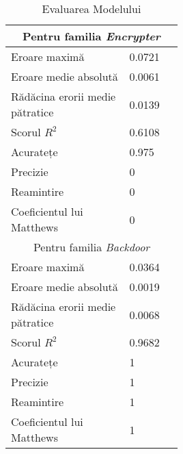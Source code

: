 \begin{table}[!htb]
    \centering
    \begin{tabular}{ | p{0.4\linewidth} | p{0.1\linewidth} | }
        \hline
        \multicolumn{2}{|c|}{Pentru familia \textit{Encrypter}} \\
        \hline
        Eroare maximă & 0.0721 \\
        Eroare medie absolută & 0.0061 \\
        Rădăcina erorii medie pătratice & 0.0139 \\
        Scorul $ R^2 $ & 0.6108 \\
        Acuratețe & 0.975 \\
        Precizie & 0 \\
        Reamintire & 0 \\
        Coeficientul lui Matthews & 0 \\
        \hline
        \multicolumn{2}{|c|}{Pentru familia \textit{Backdoor}} \\
        \hline
        Eroare maximă & 0.0364 \\
        Eroare medie absolută & 0.0019 \\
        Rădăcina erorii medie pătratice & 0.0068 \\
        Scorul $ R^2 $ & 0.9682 \\
        Acuratețe & 1 \\
        Precizie & 1 \\
        Reamintire & 1 \\
        Coeficientul lui Matthews & 1 \\
        \hline
    \end{tabular}
    \caption{Evaluarea Modelului }
    \label{tab:pe_static_full_classification_evaluation}
\end{table}